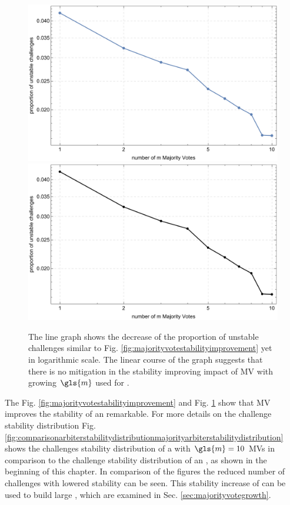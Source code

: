 \begin{figure}[htp]
\ifx{}\undefined
{}
\else
	\if{}
\centering
\includegraphics[width=1.00\textwidth]{images/single-votes-stab-simulation_loglog.pdf}
	\else
\includegraphics[width=1.00\textwidth]{images/single-votes-stab-simulation_loglog_mono.pdf}
    \fi
\fi
\caption[Decrease of unstable challenges of a \mpuf logarithmic]{The line graph shows the decrease of the proportion of unstable challenges similar to Fig. \ref{fig:majorityvotestabilityimprovement} yet in logarithmic scale. The  linear course of the graph suggests that there is no mitigation in the stability improving impact of \ac{MV} with growing $\gls{m}$ used for \mpufs.} 
\label{fig:majorityvotestabilityimprovementloglog}
\end{figure}

The Fig. \ref{fig:majorityvotestabilityimprovement} and Fig. \ref{fig:majorityvotestabilityimprovementloglog} show that \ac{MV} improves the stability of an \apuf remarkable. 
For more details on the challenge stability distribution Fig. \ref{fig:comparisonarbiterstabilitydistributionmajorityarbiterstabilitydistribution} shows the challenges stability distribution of a \mpuf with $\gls{m} = 10$ \acp{MV} in comparison to the challenge stability distribution of an \apuf, as shown in the beginning of this chapter.
In comparison of the figures the reduced number of challenges with lowered stability can be seen.
This stability increase of \mpufs can be used to build large \mxpufs, which are examined in Sec. \ref{sec:majorityvotegrowth}.


